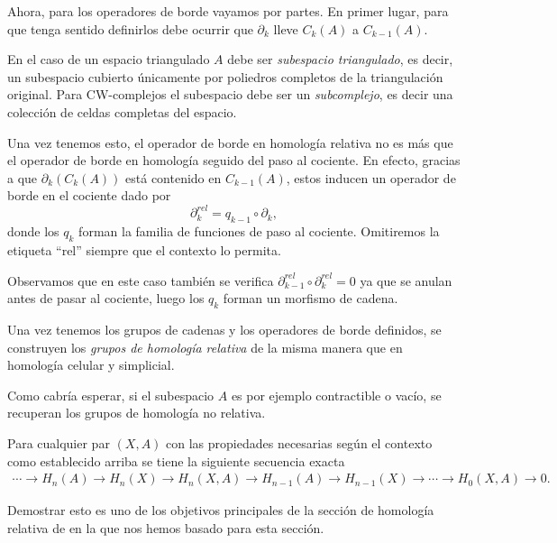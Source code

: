 Ahora, para los operadores de borde vayamos por partes. En primer lugar, para que tenga sentido definirlos debe ocurrir que $\partial_k$ lleve $C_k(A)$ a $C_{k-1}(A)$. 

En el caso de un espacio triangulado $A$ debe ser \textit{subespacio triangulado}, es decir, un subespacio cubierto únicamente por poliedros completos de la triangulación original. Para CW-complejos el subespacio debe ser un \textit{subcomplejo}, es decir una colección de celdas completas del espacio.

Una vez tenemos esto, el operador de borde en homología relativa no es más que el operador de borde en homología seguido del paso al cociente. En efecto, gracias a que $\partial_k(C_k(A))$ está contenido en $C_{k-1}(A)$, estos inducen un operador de borde en el cociente dado por
\begin{equation*}
    \partial^{rel}_k = q_{k-1}\circ\partial_k,
\end{equation*} 
donde los $q_k$ forman la familia de funciones de paso al cociente. Omitiremos la etiqueta ``rel'' siempre que el contexto lo permita.

Observamos que en este caso también se verifica $\partial^{rel}_{k-1}\circ \partial^{rel}_k = 0$ ya que se anulan antes de pasar al cociente, luego los $q_k$ forman un morfismo de cadena.

Una vez tenemos los grupos de cadenas y los operadores de borde definidos, se construyen los \textit{grupos de homología relativa} de la misma manera que en homología celular y simplicial.

\begin{nota}
    Como cabría esperar, si el subespacio $A$ es por ejemplo contractible o vacío, se recuperan los grupos de homología no relativa.
\end{nota}
\bigskip

\begin{proposition}
    Para cualquier par $(X,A)$ con las propiedades necesarias según el contexto como establecido arriba se tiene la siguiente secuencia exacta
    \begin{align*}
        \cdots \longrightarrow H_n(A) \longrightarrow H_n(X) \longrightarrow H_n(X,A) \longrightarrow H_{n-1}(A) \longrightarrow H_{n-1}(X) \longrightarrow \cdots \longrightarrow H_0(X,A) \longrightarrow 0.
    \end{align*}
\end{proposition}

Demostrar esto es uno de los objetivos principales de la sección de homología relativa de \cite[p.~115]{hatcher2002} en la que nos hemos basado para esta sección.

